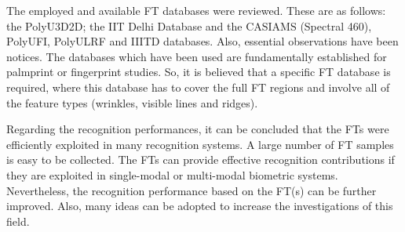 \documentclass[review]{elsarticle}
\begin{document}
	The employed and available FT databases were reviewed. These are as follows: the PolyU3D2D; the IIT Delhi Database and the CASIAMS (Spectral 460), PolyUFI, PolyULRF and IIITD databases. Also, essential observations have been notices. The databases which have been used are fundamentally established for palmprint or fingerprint studies. So, it is believed that a specific FT database is required, where this database has to cover the full FT regions and involve all of the feature types (wrinkles, visible lines and ridges).

	Regarding the recognition performances, it can be concluded that the FTs were efficiently exploited in many recognition systems. A large number of FT samples is easy to be collected. The FTs can provide effective recognition contributions if they are exploited in single-modal or multi-modal biometric systems. Nevertheless, the recognition performance based on the FT(s) can be further improved. Also, many ideas can be adopted to increase the investigations of this field. 
\end{document}
